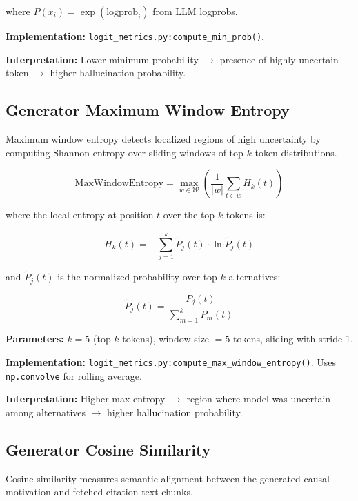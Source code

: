 where $P(x_i) = \exp(\text{logprob}_i)$ from LLM logprobs.

\textbf{Implementation:} \texttt{logit\_metrics.py:compute\_min\_prob()}.

\textbf{Interpretation:} Lower minimum probability $\rightarrow$ presence of highly uncertain token $\rightarrow$ higher hallucination probability.

\subsection{Generator Maximum Window Entropy}

Maximum window entropy detects localized regions of high uncertainty by computing Shannon entropy over sliding windows of top-$k$ token distributions.

\begin{equation}
\text{MaxWindowEntropy} = \max_{w \in \mathcal{W}} \left( \frac{1}{|w|} \sum_{t \in w} H_k(t) \right)
\label{eq:maxent_def}
\end{equation}

where the local entropy at position $t$ over the top-$k$ tokens is:

\begin{equation}
H_k(t) = -\sum_{j=1}^{k} \tilde{P}_j(t) \cdot \ln \tilde{P}_j(t)
\label{eq:local_entropy_def}
\end{equation}

and $\tilde{P}_j(t)$ is the normalized probability over top-$k$ alternatives:

\begin{equation}
\tilde{P}_j(t) = \frac{P_j(t)}{\sum_{m=1}^{k} P_m(t)}
\label{eq:normalized_prob_def}
\end{equation}

\textbf{Parameters:} $k = 5$ (top-$k$ tokens), window size $= 5$ tokens, sliding with stride 1.

\textbf{Implementation:} \texttt{logit\_metrics.py:compute\_max\_window\_entropy()}. Uses \texttt{np.convolve} for rolling average.

\textbf{Interpretation:} Higher max entropy $\rightarrow$ region where model was uncertain among alternatives $\rightarrow$ higher hallucination probability.

\subsection{Generator Cosine Similarity}

Cosine similarity measures semantic alignment between the generated causal motivation and fetched citation text chunks.

